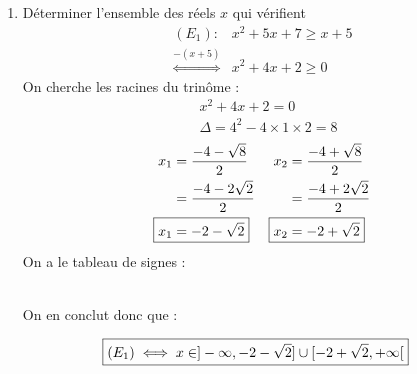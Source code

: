 \begin{exercice}
\begin{enumerate}
    \item Déterminer l'ensemble des réels $x$ qui vérifient 
    \begin{align*}
        (E_1) : &x^2 + 5x + 7 \geq x + 5 \\
        \overset{-(x+5)}{\iff} &x^2 + 4x + 2 \geq 0
    \end{align*}
    On cherche les racines du trinôme :
    \begin{align*}
        &x^2 + 4x + 2 = 0 \\
        &\Delta = 4^2 - 4 \times 1 \times 2 = 8
    \end{align*}
    \begin{align*}
        x_1 &= \frac{-4 - \sqrt{8}}{2} & x_2 &= \frac{-4 + \sqrt{8}}{2} \\
            &= \frac{-4 - 2\sqrt{2}}{2} &    &= \frac{-4 + 2\sqrt{2}}{2} \\
        \Aboxed{x_1 &= -2 - \sqrt{2}} & \Aboxed{x_2 &= -2 + \sqrt{2}}
    \end{align*}
    On a le tableau de signes :
    \begin{figure}[h!]
        \centering
    \end{figure}
    \\
    On en conclut donc que :
    \begin{figure}[h!]
        \centering
        \begin{align*}
            \Aboxed{(E_1) \iff x \in ]-\infty, -2 - \sqrt{2}] \cup [-2 + \sqrt{2}, +\infty[}
        \end{align*}
    \end{figure}
\end{enumerate}
\end{exercice}

